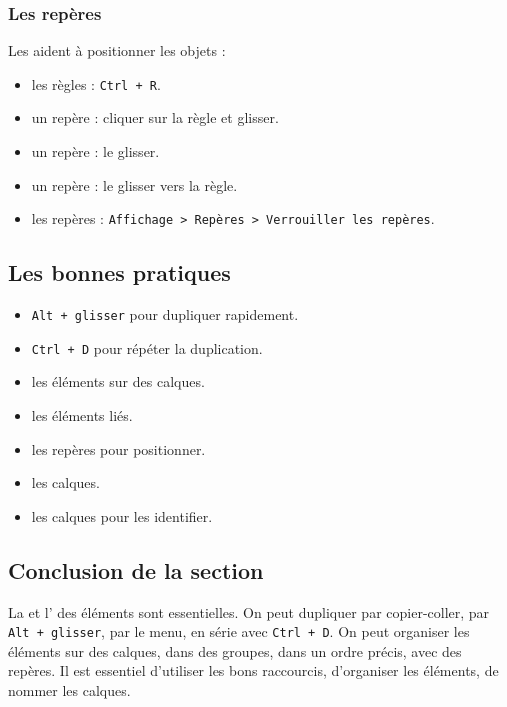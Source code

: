 \subsubsection{Les repères}

Les  aident à positionner les objets :

\begin{itemize}
    \item {} les règles : \texttt{Ctrl + R}.
    \item {} un repère : cliquer sur la règle et glisser.
    \item {} un repère : le glisser.
    \item {} un repère : le glisser vers la règle.
    \item {} les repères : \texttt{Affichage > Repères > Verrouiller les repères}.
\end{itemize}

\subsection{Les bonnes pratiques}

\begin{itemize}
    \item {} \texttt{Alt + glisser} pour dupliquer rapidement.
    \item {} \texttt{Ctrl + D} pour répéter la duplication.
    \item {} les éléments sur des calques.
    \item {} les éléments liés.
    \item {} les repères pour positionner.
    \item {} les calques.
    \item {} les calques pour les identifier.
\end{itemize}

\subsection*{Conclusion de la section}

La  et l' des éléments sont essentielles. On peut dupliquer par copier-coller, par \texttt{Alt + glisser}, par le menu, en série avec \texttt{Ctrl + D}. On peut organiser les éléments sur des calques, dans des groupes, dans un ordre précis, avec des repères. Il est essentiel d'utiliser les bons raccourcis, d'organiser les éléments, de nommer les calques.

